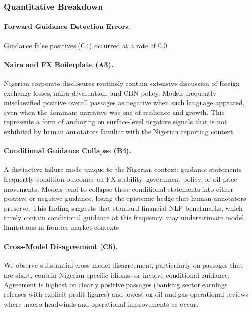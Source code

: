 \subsubsection*{Quantitative Breakdown}


\paragraph{Forward Guidance Detection Errors.}
Guidance false positives (C4) occurred at a rate of 0.0%

\paragraph{Naira and FX Boilerplate (A3).}
Nigerian corporate disclosures routinely contain extensive discussion of foreign exchange losses, naira devaluation, and CBN policy. Models frequently misclassified positive overall passages as negative when such language appeared, even when the dominant narrative was one of resilience and growth. This represents a form of anchoring on surface-level negative signals that is not exhibited by human annotators familiar with the Nigerian reporting context.

\paragraph{Conditional Guidance Collapse (B4).}
A distinctive failure mode unique to the Nigerian context: guidance statements frequently condition outcomes on FX stability, government policy, or oil price movements. Models tend to collapse these conditional statements into either positive or negative guidance, losing the epistemic hedge that human annotators preserve. This finding suggests that standard financial NLP benchmarks, which rarely contain conditional guidance at this frequency, may underestimate model limitations in frontier market contexts.

\paragraph{Cross-Model Disagreement (C5).}
We observe substantial cross-model disagreement, particularly on passages that are short, contain Nigerian-specific idioms, or involve conditional guidance. Agreement is highest on clearly positive passages (banking sector earnings releases with explicit profit figures) and lowest on oil and gas operational reviews where macro headwinds and operational improvements co-occur.

